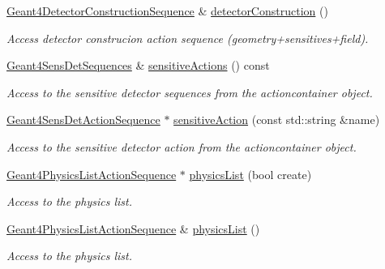 \begin{DoxyCompactItemize}
\hyperlink{class_d_d4hep_1_1_simulation_1_1_geant4_detector_construction_sequence}{Geant4DetectorConstructionSequence} \& \hyperlink{class_d_d4hep_1_1_simulation_1_1_geant4_action_container_a21020ac85efccf58c0b292d25a954a15}{detectorConstruction} ()
\begin{DoxyCompactList}\small\item\em Access detector construcion action sequence (geometry+sensitives+field). \item\end{DoxyCompactList}\item 
\hyperlink{class_d_d4hep_1_1_simulation_1_1_geant4_sens_det_sequences}{Geant4SensDetSequences} \& \hyperlink{class_d_d4hep_1_1_simulation_1_1_geant4_action_container_a971e91e6d2d1d6ef8affe7038100a1a6}{sensitiveActions} () const 
\begin{DoxyCompactList}\small\item\em Access to the sensitive detector sequences from the actioncontainer object. \item\end{DoxyCompactList}\item 
\hyperlink{class_d_d4hep_1_1_simulation_1_1_geant4_sens_det_action_sequence}{Geant4SensDetActionSequence} $\ast$ \hyperlink{class_d_d4hep_1_1_simulation_1_1_geant4_action_container_a13189a89fc7c733634c3fe8f898f18d3}{sensitiveAction} (const std::string \&name)
\begin{DoxyCompactList}\small\item\em Access to the sensitive detector action from the actioncontainer object. \item\end{DoxyCompactList}\item 
\hyperlink{class_d_d4hep_1_1_simulation_1_1_geant4_physics_list_action_sequence}{Geant4PhysicsListActionSequence} $\ast$ \hyperlink{class_d_d4hep_1_1_simulation_1_1_geant4_action_container_a78cbddc837b75f151cf76b483b588fb1}{physicsList} (bool create)
\begin{DoxyCompactList}\small\item\em Access to the physics list. \item\end{DoxyCompactList}\item 
\hyperlink{class_d_d4hep_1_1_simulation_1_1_geant4_physics_list_action_sequence}{Geant4PhysicsListActionSequence} \& \hyperlink{class_d_d4hep_1_1_simulation_1_1_geant4_action_container_aaeb1188d7bf8338290d1d7080c5c2e18}{physicsList} ()
\begin{DoxyCompactList}\small\item\em Access to the physics list. \item\end{DoxyCompactList}\item 

\end{DoxyCompactItemize}
